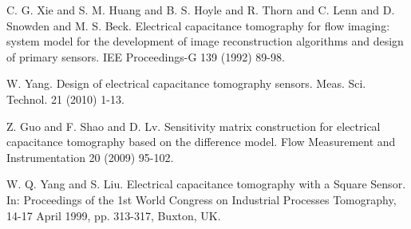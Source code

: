 
\begin{thebibliography}{10}

{\sc C. G. Xie and S. M. Huang and B. S. Hoyle and R. Thorn and C. Lenn and D. Snowden and M. S. Beck}. {Electrical capacitance tomography for flow imaging: system model for the development of image reconstruction algorithms and design of primary sensors}. IEE Proceedings-G 139 (1992) 89-98.



{\sc W. Yang}. {Design of electrical capacitance tomography sensors}. Meas. Sci. Technol. 21 (2010) 1-13.



{\sc Z. Guo and F. Shao and D. Lv}. {Sensitivity matrix construction for electrical capacitance tomography based on the difference model}. Flow Measurement and Instrumentation 20 (2009) 95-102.



{\sc W. Q. Yang and S. Liu}. {Electrical capacitance tomography with a Square Sensor}. In: Proceedings of the 1st World Congress on Industrial Processes Tomography, 14-17 April 1999, pp. 313-317, Buxton, UK.

\end{thebibliography}
